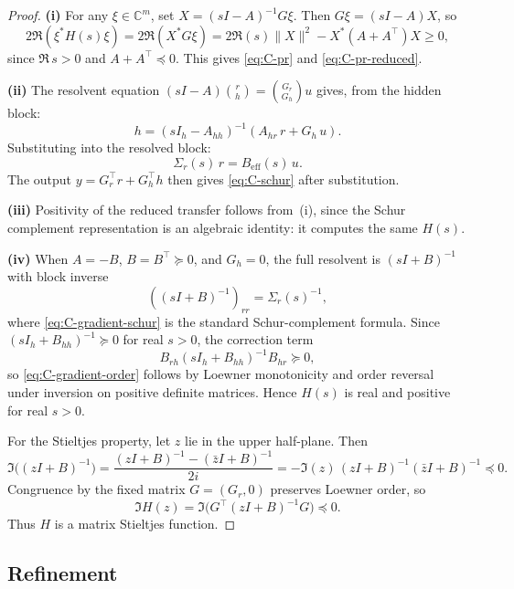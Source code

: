 \documentclass[11pt,a4paper]{article}
\numberwithin{equation}{section}
\newcommand{\C}{\mathbb{C}}
\theoremstyle{thmcompact}
\theoremstyle{remark}
\begin{document}
\begin{proof}
\textbf{(i)} For any $\xi \in \C^m$, set $X = (sI - A)^{-1}G\xi$. Then $G\xi = (sI - A)X$, so
\[
2\Re(\xi^* H(s)\xi) = 2\Re(X^* G\xi) = 2\Re(s)\|X\|^2 - X^*(A + A^\top)X \geq 0,
\]
since $\Re\,s > 0$ and $A + A^\top \preceq 0$. This gives \eqref{eq:C-pr} and \eqref{eq:C-pr-reduced}.

\textbf{(ii)} The resolvent equation $(sI - A)\binom{r}{h} = \binom{G_r}{G_h}u$ gives, from the hidden block:
\[
h = (sI_h - A_{hh})^{-1}(A_{hr}\,r + G_h\,u).
\]
Substituting into the resolved block:
\[
\Sigma_r(s)\,r = B_{\mathrm{eff}}(s)\,u.
\]
The output $y = G_r^\top r + G_h^\top h$ then gives \eqref{eq:C-schur} after substitution.

\textbf{(iii)} Positivity of the reduced transfer follows from~(i), since the Schur complement representation is an algebraic identity: it computes the same $H(s)$.

\textbf{(iv)} When $A = -B$, $B = B^\top \succeq 0$, and $G_h = 0$, the full resolvent is $(sI+B)^{-1}$ with block inverse
\[
((sI+B)^{-1})_{rr}=\Sigma_r(s)^{-1},
\]
where \eqref{eq:C-gradient-schur} is the standard Schur-complement formula. Since $(sI_h+B_{hh})^{-1}\succeq 0$ for real $s>0$, the correction term
\[
B_{rh}(sI_h+B_{hh})^{-1}B_{hr}\succeq 0,
\]
so \eqref{eq:C-gradient-order} follows by Loewner monotonicity and order reversal under inversion on positive definite matrices. Hence $H(s)$ is real and positive for real $s>0$.

For the Stieltjes property, let $z$ lie in the upper half-plane. Then
\[
\Im\bigl((zI+B)^{-1}\bigr)=\frac{(zI+B)^{-1}-(\bar z I+B)^{-1}}{2i}=-\Im(z)\,(zI+B)^{-1}(\bar z I+B)^{-1}\preceq 0.
\]
Congruence by the fixed matrix $G=(G_r,0)$ preserves Loewner order, so
\[
\Im H(z)=\Im\bigl(G^\top(zI+B)^{-1}G\bigr)\preceq 0.
\]
Thus $H$ is a matrix Stieltjes function.
\end{proof}

\subsection{Refinement}
\end{document}
